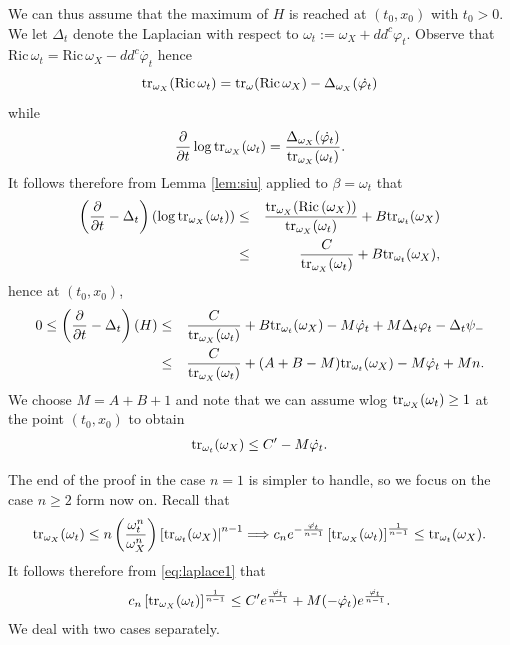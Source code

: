 \documentclass[a4paper,11pt,leqno,english]{smfart}
\theoremstyle{plain}
\theoremstyle{plain}
\numberwithin{equation}{section} %
\numberwithin{figure}{section} %
\theoremstyle{plain}
\theoremstyle{plain}
\theoremstyle{remark}
\theoremstyle{remark}
\theoremstyle{definition}
\theoremstyle{plain}
\theoremstyle{plain}
\theoremstyle{definition}
\newcommand{\f}{\varphi}
\newcommand{\p}{\psi}
\newcommand{\Ric}{\mathrm{Ric} \,}
\begin{document}
We can thus assume that the maximum of $H$ is reached at $(t_0,x_0)$ with $t_0>0$.
We let $\Delta_t$ denote the Laplacian with respect to $\omega_t:=\omega_X+dd^c \f_t$.
Observe that 
$\Ric \omega_t =\Ric \omega_X-dd^c \dot{\f_t}$ hence
$$
{\rm tr}_{\omega_X}(\Ric \omega_t)={\rm tr}_{\omega}(\Ric \omega_X)-\Delta_{\omega_X}(\dot{\f_t})
$$
while
$$
\frac{\partial}{\partial t} \log {\rm tr}_{\omega_X}(\omega_t)=
\frac{\Delta_{\omega_X}(\dot{\f_t})}{{\rm tr}_{\omega_X}(\omega_t)}.
$$
It follows therefore from Lemma \ref{lem:siu} applied to $\beta=\omega_t$ that
\begin{eqnarray*}
\left(\frac{\partial}{\partial t}-\Delta_t \right)(\log {\rm tr}_{\omega_X}(\omega_t))
&\leq & \frac{{\rm tr}_{\omega_X}(\Ric(\omega_X))}{{\rm tr}_{\omega_X}(\omega_t)}+B {\rm tr}_{\omega_t}(\omega_X) \\
&\leq & \frac{C}{{\rm tr}_{\omega_X}(\omega_t)}+B {\rm tr}_{\omega_t}(\omega_X),
\end{eqnarray*}
hence at $(t_0,x_0)$,
\begin{eqnarray*}
0 \leq \left(\frac{\partial}{\partial t}-\Delta_t \right)(H) 
& \leq & \frac{C}{{\rm tr}_{\omega_X}(\omega_t)}+B {\rm tr}_{\omega_t}(\omega_X) -M \dot{\f_t}+M\Delta_t \f_t-\Delta_t \p_-\\
&\leq &  \frac{C}{{\rm tr}_{\omega_X}(\omega_t)}+(A+B-M) {\rm tr}_{\omega_t}(\omega_X)-M \dot{\f_t}+Mn.
\end{eqnarray*}
We choose $M=A+B+1$ and note that we can assume wlog ${\rm tr}_{\omega_X}(\omega_t) \geq 1$ at the point $(t_0, x_0)$ to obtain
\begin{eqnarray} \label{eq:laplace1}
{\rm tr}_{\omega_t}(\omega_X) \leq C'-M \dot{\f_t}.
\end{eqnarray}

The end of the proof in the case $n=1$ is simpler to handle, so we focus on the case $n \geq 2$ form now on. Recall that
$$
{\rm tr}_{\omega_X}(\omega_t) \leq n \left( \frac{\omega_t^n}{\omega_X^n} \right) \left[{\rm tr}_{\omega_t}(\omega_X) \right|^{n-1}
\Longrightarrow 
c_n e^{-\frac{\dot{\f_t}}{n-1}} \left[ {\rm tr}_{\omega_X}(\omega_t) \right]^{\frac{1}{n-1}}
\leq {\rm tr}_{\omega_t}(\omega_X).
$$
It follows therefore from \eqref{eq:laplace1} that
\begin{equation}
\label{ineq tr}
c_n  \left[ {\rm tr}_{\omega_X}(\omega_t) \right]^{\frac{1}{n-1}} \leq C'e^{\frac{\dot{\f_t}}{n-1}}+M (-\dot{\f_t})e^{\frac{\dot{\f_t}}{n-1}}.
\end{equation}
We deal with two cases separately. 
\end{document}
